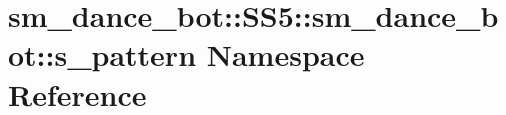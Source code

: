 \hypertarget{namespacesm__dance__bot_1_1SS5_1_1sm__dance__bot_1_1s__pattern}{}\section{sm\+\_\+dance\+\_\+bot\+:\+:S\+S5\+:\+:sm\+\_\+dance\+\_\+bot\+:\+:s\+\_\+pattern Namespace Reference}
\label{namespacesm__dance__bot_1_1SS5_1_1sm__dance__bot_1_1s__pattern}
